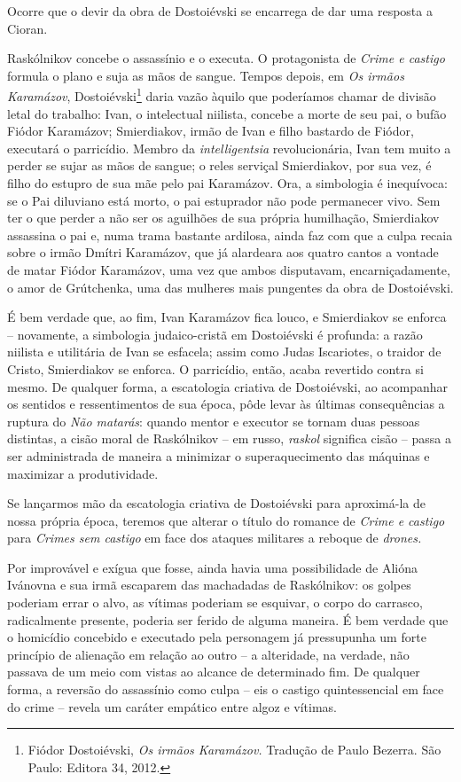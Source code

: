 Ocorre que o devir da obra de Dostoiévski se encarrega de dar uma
resposta a Cioran.

Raskólnikov concebe o assassínio e o executa. O protagonista de
\emph{Crime e castigo} formula o plano e suja as mãos de sangue. Tempos
depois, em \emph{Os irmãos Karamázov}, Dostoiévski\footnote{Fiódor
  Dostoiévski, \emph{Os irmãos Karamázov.} Tradução de Paulo Bezerra.
  São Paulo: Editora 34, 2012.} daria vazão àquilo que poderíamos chamar
de divisão letal do trabalho: Ivan, o intelectual niilista, concebe a
morte de seu pai, o bufão Fiódor Karamázov; Smierdiakov, irmão de Ivan e
filho bastardo de Fiódor, executará o parricídio. Membro da
\emph{intelligentsia} revolucionária, Ivan tem muito a perder se sujar
as mãos de sangue; o reles serviçal Smierdiakov, por sua vez, é filho do
estupro de sua mãe pelo pai Karamázov. Ora, a simbologia é inequívoca:
se o Pai diluviano está morto, o pai estuprador não pode permanecer
vivo. Sem ter o que perder a não ser os aguilhões de sua própria
humilhação, Smierdiakov assassina o pai e, numa trama bastante ardilosa,
ainda faz com que a culpa recaia sobre o irmão Dmítri Karamázov, que já
alardeara aos quatro cantos a vontade de matar Fiódor Karamázov, uma vez
que ambos disputavam, encarniçadamente, o amor de Grútchenka, uma das
mulheres mais pungentes da obra de Dostoiévski.

É bem verdade que, ao fim, Ivan Karamázov fica louco, e Smierdiakov se
enforca -- novamente, a simbologia judaico-cristã em Dostoiévski é
profunda: a razão niilista e utilitária de Ivan se esfacela; assim como
Judas Iscariotes, o traidor de Cristo, Smierdiakov se enforca. O
parricídio, então, acaba revertido contra si mesmo. De qualquer forma, a
escatologia criativa de Dostoiévski, ao acompanhar os sentidos e
ressentimentos de sua época, pôde levar às últimas consequências a
ruptura do \emph{Não matarás}: quando mentor e executor se tornam duas
pessoas distintas, a cisão moral de Raskólnikov -- em russo,
\emph{raskol} significa cisão -- passa a ser administrada de maneira a
minimizar o superaquecimento das máquinas e maximizar a produtividade.

Se lançarmos mão da escatologia criativa de Dostoiévski para aproximá-la
de nossa própria época, teremos que alterar o título do romance de
\emph{Crime e castigo} para \emph{Crimes sem castigo} em face dos
ataques militares a reboque de \emph{drones. }

Por improvável e exígua que fosse, ainda havia uma possibilidade de
Alióna Ivánovna e sua irmã escaparem das machadadas de Raskólnikov: os
golpes poderiam errar o alvo, as vítimas poderiam se esquivar, o corpo
do carrasco, radicalmente presente, poderia ser ferido de alguma
maneira. É bem verdade que o homicídio concebido e executado pela
personagem já pressupunha um forte princípio de alienação em relação ao
outro -- a alteridade, na verdade, não passava de um meio com vistas ao
alcance de determinado fim. De qualquer forma, a reversão do assassínio
como culpa -- eis o castigo quintessencial em face do crime -- revela um
caráter empático entre algoz e vítimas.

